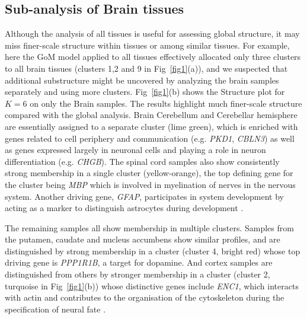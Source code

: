 \documentclass[10pt,letterpaper]{article}
\begin{document}
%

\subsection*{Sub-analysis of Brain tissues}

Although the analysis of all tissues is useful for assessing global structure, it may miss finer-scale structure within tissues or among similar tissues. For example, here the GoM model applied to all tissues effectively allocated only three clusters to all brain tissues (clusters 1,2 and 9 in Fig~\ref{fig1}(a)), and we suspected that additional substructure might be uncovered by analyzing the brain samples separately and using more clusters.  Fig~\ref{fig1}(b) shows the Structure plot for $K=6$ on only the Brain samples. The results highlight much finer-scale structure compared with the global analysis. Brain Cerebellum and Cerebellar hemisphere are essentially assigned to a separate cluster (lime green), which is enriched with genes related to cell periphery and communication (e.g. \textit{PKD1}, \textit{CBLN3}) as well as genes expressed largely in neuronal cells and playing a role in neuron differentiation (e.g. \textit{CHGB}). The spinal cord samples also show consistently strong membership in a single cluster (yellow-orange), the top defining gene for the cluster being \textit{MBP} which is involved in myelination of nerves in the nervous system\cite{Hu2016}.  Another driving gene, \textit{GFAP}, participates in system development by acting as a marker to distinguish astrocytes during development \cite{Baba1997}.

The remaining samples all show membership in multiple clusters. Samples from the putamen, caudate and nucleus accumbens show similar profiles, and are distinguished by strong membership in a cluster (cluster 4, bright red) whose top driving gene is \textit{PPP1R1B}, a target for dopamine. And cortex samples are distinguished from others by stronger membership in a cluster (cluster 2, turquoise in Fig~\ref{fig1}(b)) whose distinctive genes include \textit{ENC1}, which interacts with actin and contributes to the organisation of the cytoskeleton during the specification of neural fate \cite{Hernandez1997}.
\end{document}
